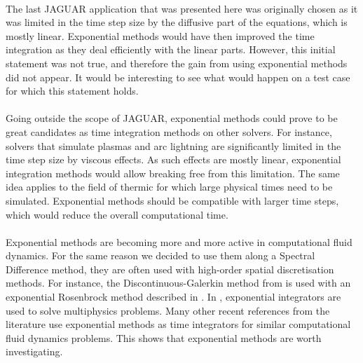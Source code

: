     \paragraph{}
    The last JAGUAR application that was presented here was originally chosen as it was limited in the time step size by the diffusive part of the equations, which is mostly linear.
    Exponential methods would have then improved the time integration as they deal efficiently with the linear parts.
    However, this initial statement was not true, and therefore the gain from using exponential methods did not appear.
    It would be interesting to see what would happen on a test case for which this statement holds.

    \paragraph{}
    Going outside the scope of JAGUAR, exponential methods could prove to be great candidates as time integration methods on other solvers.
    For instance, solvers that simulate plasmas and arc lightning are significantly limited in the time step size by viscous effects.
    As such effects are mostly linear, exponential integration methods would allow breaking free from this limitation.
    The same idea applies to the field of thermic for which large physical times need to be simulated.
    Exponential methods should be compatible with larger time steps, which would reduce the overall computational time.

    \paragraph{}
    Exponential methods are becoming more and more active in computational fluid dynamics.
    For the same reason we decided to use them along a Spectral Difference method, they are often used with high-order spatial discretisation methods.
    For instance, the Discontinuous-Galerkin method from \cite{Li2013} is used with an exponential Rosenbrock method described in \cite{LiLuoWangEtAl2018, Li2020}.
    In \cite{NarayanamurthiSandu2021}, exponential integrators are used to solve multiphysics problems.
    Many other recent references from the literature use exponential methods as time integrators for similar computational fluid dynamics problems.
    This shows that exponential methods are worth investigating.
